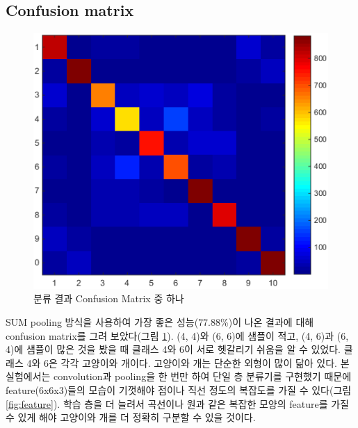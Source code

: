 \documentclass[a4paper,9pt]{article}
\begin{document}
\begin{multicols*}{2}
\subsection{Confusion matrix}

\begin{figure}[H]
\includegraphics[width=\linewidth]{confusion_matrix}
\caption{분류 결과 Confusion Matrix 중 하나}
\label{fig:confusion_matrix}
\end{figure}

SUM pooling 방식을 사용하여 가장 좋은 성능($77.88$\%)이 나온 결과에 대해 confusion matrix를 그려 보았다(그림 \ref{fig:confusion_matrix}).
(4, 4)와 (6, 6)에 샘플이 적고, (4, 6)과 (6, 4)에 샘플이 많은 것을 봤을 때 클래스 4와 6이 서로 헷갈리기 쉬움을 알 수 있었다.
클래스 4와 6은 각각 고양이와 개이다.
고양이와 개는 단순한 외형이 많이 닮아 있다.
본 실험에서는 convolution과 pooling을 한 번만 하여 단일 층 분류기를 구현했기 때문에 feature(6x6x3)들의 모습이 기껏해야 점이나 직선 정도의 복잡도를 가질 수 있다(그림 \ref{fig:feature}).
학습 층을 더 늘려서 곡선이나 원과 같은 복잡한 모양의 feature를 가질 수 있게 해야 고양이와 개를 더 정확히 구분할 수 있을 것이다.


\end{multicols*}
\end{document}
